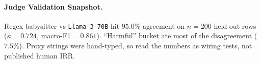 \paragraph{Judge Validation Snapshot.} Regex babysitter vs \texttt{Llama-3-70B} hit $95.0\%$ agreement on $n{=}200$ held-out rows ($\kappa{=}0.724$, macro-F1${=}0.861$). ``Harmful'' bucket ate most of the disagreement ($7.5\%$). Proxy strings were hand-typed, so read the numbers as wiring tests, not published human IRR.
